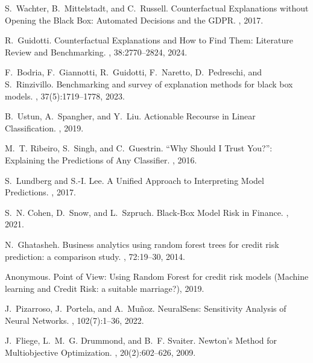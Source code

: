 \documentclass[12pt]{extarticle}
\numberwithin{equation}{section}
\begin{document}
\begin{thebibliography}{99}

S.~Wachter, B.~Mittelstadt, and C.~Russell.
\newblock Counterfactual Explanations without Opening the Black Box: Automated Decisions and the GDPR.
, 2017.

R.~Guidotti.
\newblock Counterfactual Explanations and How to Find Them: Literature Review and Benchmarking.
, 38:2770--2824, 2024.

F.~Bodria, F.~Giannotti, R.~Guidotti, F.~Naretto, D.~Pedreschi, and S.~Rinzivillo.
\newblock Benchmarking and survey of explanation methods for black box models.
, 37(5):1719--1778, 2023.

B.~Ustun, A.~Spangher, and Y.~Liu.
\newblock Actionable Recourse in Linear Classification.
, 2019.

M.~T. Ribeiro, S.~Singh, and C.~Guestrin.
\newblock ``Why Should I Trust You?'': Explaining the Predictions of Any Classifier.
, 2016.

S.~Lundberg and S.-I. Lee.
\newblock A Unified Approach to Interpreting Model Predictions.
, 2017.

S.~N. Cohen, D.~Snow, and L.~Szpruch.
\newblock Black-Box Model Risk in Finance.
, 2021.

N.~Ghatasheh.
\newblock Business analytics using random forest trees for credit risk prediction: a comparison study.
, 72:19--30, 2014.

Anonymous.
\newblock Point of View: Using Random Forest for credit risk models (Machine learning and Credit Risk: a suitable marriage?), 2019.

J.~Pizarroso, J.~Portela, and A.~Mu\~noz.
\newblock NeuralSens: Sensitivity Analysis of Neural Networks.
, 102(7):1--36, 2022.

J.~Fliege, L.~M.~G. Drummond, and B.~F. Svaiter.
\newblock Newton's Method for Multiobjective Optimization.
, 20(2):602--626, 2009.


\end{thebibliography}
\end{document}
